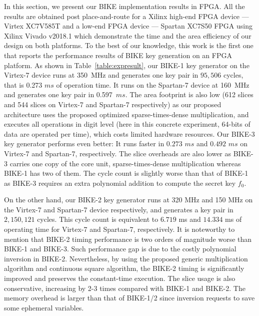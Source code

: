\documentclass[runningheads]{llncs}
\begin{document}
In this section, we present our BIKE implementation results in FPGA. All the results are obtained post place-and-route for a  Xilinx high-end FPGA device --- Virtex XC7V585T  and a low-end FPGA device ---  Spartan XC7S50 FPGA using Xilinx Vivado v2018.1 which demonstrate the time and the area efficiency of our design on both platforms. To the best of our knowledge, this work is the first one that reports the performance results of BIKE key generation on an FPGA platform. As shown in Table~\ref{table:expresult}, our BIKE-1 key generator on the Virtex-7 device runs at 350~MHz and generates one key pair  in $95,506$ cycles, that is 0.273 $ms$ of operation time. It runs on the Spartan-7 device at 160~MHz and generates one key pair in 0.597~$ms$. The area footprint is also low (612 slices and 544 slices on Virtex-7 and Spartan-7 respectively) as our proposed architecture uses the proposed optimized sparse-times-dense multiplication, and executes all operations in digit level (here in this concrete experiment, 64-bits of data are operated per time), which costs limited hardware resources. Our BIKE-3 key generator performs even better: It runs faster in $0.273$ $ms$ and $0.492$ $ms$ on Virtex-7 and Spartan-7, respectively. The slice overheads are also lower as BIKE-3 carries one copy of the core unit, sparse-times-dense multiplication whereas BIKE-1 has two of them. The cycle count is slightly worse than that of BIKE-1 as BIKE-3 requires an extra polynomial addition to compute the secret key $f_0$.

On the other hand, our BIKE-2 key generator runs at 320 MHz and 150 MHz on the Virtex-7 and Spartan-7 device respectively, and generates a key pair in $2,150,121$ cycles. This cycle count is equivalent to $6.719$ ms and $14.334$ ms of operating time for Virtex-7 and Spartan-7, respectively. It is noteworthy to mention that BIKE-2 timing performance is  two orders of magnitude worse than BIKE-1 and BIKE-3.  Such performance gap is due to the costly polynomial inversion in BIKE-2. Nevertheless, by using the proposed generic multiplication algorithm and continuous square algorithm, the BIKE-2 timing is significantly improved and preserves the constant-time execution. The slice usage is also conservative, increasing by 2-3 times compared with BIKE-1 and BIKE-2.  The memory overhead is larger than that of BIKE-1/2 since inversion requests to save some ephemeral variables.
\end{document}
